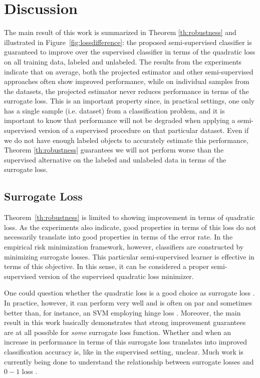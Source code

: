\documentclass[twoside]{memoir}\usepackage[]{graphicx}\usepackage{xcolor}
\begin{document}
\section{Discussion}
The main result of this work is summarized in Theorem \ref{th:robustness} and illustrated in Figure~\ref{fig:lossdifference}: the proposed semi-supervised classifier is guaranteed to improve over the supervised classifier in terms of the quadratic loss on all training data, labeled and unlabeled. The results from the experiments indicate that on average, both the projected estimator and other semi-supervised approaches often show improved performance, while on individual samples from the datasets, the projected estimator never reduces performance in terms of the surrogate loss. This is an important property since, in practical settings, one only has a single sample (i.e. dataset) from a classification problem, and it is important to know that performance will not be degraded when applying a semi-supervised version of a supervised procedure on that particular dataset. Even if we do not have enough labeled objects to accurately estimate this performance, Theorem \ref{th:robustness} guarantees we will not perform worse than the supervised alternative on the labeled and unlabeled data in terms of the surrogate loss. 

\subsection{Surrogate Loss}
Theorem~\ref{th:robustness} is limited to showing improvement in terms of quadratic loss. As the experiments also indicate, good properties in terms of this loss do not necessarily translate into good properties in terms of the error rate. In the empirical risk minimization framework, however, classifiers are constructed by minimizing surrogate losses. This particular semi-supervised learner is effective in terms of this objective. In this sense, it can be considered a proper semi-supervised version of the supervised quadratic loss minimizer.

One could question whether the quadratic loss is a good choice as surrogate loss \citep{Ben-David2012}. In practice, however, it can perform very well and is often on par and sometimes better than, for instance, an SVM employing hinge loss \citep{Rasmussen2005,Hastie2009,Poggio2003}. Moreover, the main result in this work basically demonstrates that strong improvement guarantees are at all possible for \emph{some} surrogate loss function. Whether and when an increase in performance in terms of this surrogate loss translates into improved classification accuracy is, like in the supervised setting, unclear. Much work is currently being done to understand the relationship between surrogate losses and ${0}-{1}$ loss \citep{Bartlett2006, Ben-David2012}. 
\end{document}
